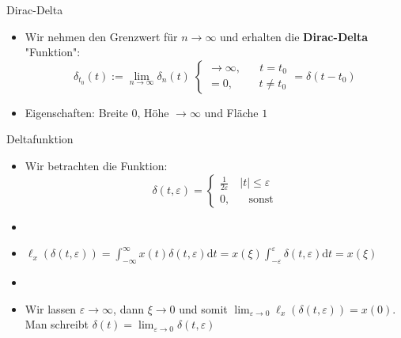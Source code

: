 \documentclass[14pt, aspectratio=169, handout]{beamer}
\begin{document}
\begin{frame}{Dirac-Delta}
    \begin{itemize}
        \item Wir nehmen den Grenzwert für $n \to \infty$ und erhalten die \textbf{Dirac-Delta} "Funktion":
        $$\delta_{t_0}(t) := \lim_{n \to \infty} \delta_n(t) \; \begin{cases}
        \to \infty, \hspace{20pt} t = t_0\\
        = 0, \hspace{28pt} t \neq t_0
        \end{cases} = \delta(t-t_0)$$
        \item Eigenschaften: Breite $0$, Höhe $\to \infty$ und Fläche $1$
    \end{itemize}
\end{frame}

\begin{frame}{Deltafunktion}
    \begin{itemize}
        \item Wir betrachten die Funktion:
        $$\delta(t, \varepsilon) = \begin{cases}
        \frac{1}{2\varepsilon} \hspace{12pt} |t|\leq \varepsilon\\
        0, \hspace{20pt} \text{sonst}
    \end{cases}$$
    \item[] 
    \item $\ell_x(\delta(t, \varepsilon)) = \displaystyle\int_{-\infty}^{\infty} x(t) \delta(t, \varepsilon)\text{d}t = x(\xi) \displaystyle\int_{-\varepsilon}^\varepsilon \delta(t, \varepsilon)\text{d}t = x(\xi)$
    \item[] 
    \item Wir lassen $\varepsilon \to \infty$, dann $\xi \to 0$ und somit $\displaystyle\lim_{\varepsilon \to 0} \ell_x(\delta(t, \varepsilon)) = x(0)$. Man schreibt $\delta(t) = \displaystyle\lim_{\varepsilon \to 0}\delta(t,\varepsilon)$
    \end{itemize}
\end{frame}
\end{document}
